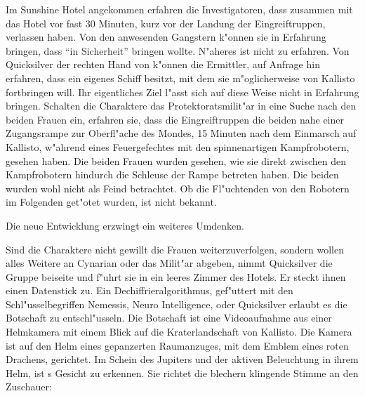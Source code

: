 Im Sunshine Hotel angekommen erfahren die Investigatoren, dass \xl{} zusammen mit \ml{} das Hotel vor fast 30 Minuten, kurz vor der Landung der Eingreiftruppen, verlassen haben. Von den anwesenden Gangstern k"onnen sie in Erfahrung bringen, dass \xl{} \ml{} ``in Sicherheit'' bringen wollte. N"aheres ist nicht zu erfahren. Von Quicksilver der rechten Hand von \xl{} k"onnen die Ermittler, auf Anfrage hin erfahren, dass \xl{} ein eigenes Schiff besitzt, mit dem sie m"oglicherweise \ml{} von Kallisto fortbringen will. Ihr eigentliches Ziel l"asst sich auf diese Weise nicht in Erfahrung bringen. Schalten die Charaktere das Protektoratsmilit"ar in eine Suche nach den beiden Frauen ein, erfahren sie, dass die Eingreiftruppen die beiden nahe einer Zugangsrampe zur Oberfl"ache des Mondes, 15 Minuten nach dem Einmarsch auf Kallisto, w"ahrend eines Feuergefechtes mit den spinnenartigen Kampfrobotern, gesehen haben. Die beiden Frauen wurden gesehen, wie sie direkt zwischen den Kampfrobotern hindurch die Schleuse der Rampe betreten haben. Die beiden wurden wohl nicht als Feind betrachtet. Ob die Fl"uchtenden von den Robotern im Folgenden get"otet wurden, ist nicht bekannt.

Die neue Entwicklung erzwingt ein weiteres Umdenken.

Sind die Charaktere nicht gewillt die Frauen weiterzuverfolgen, sondern wollen alles Weitere an Cynarian oder das Milit"ar abgeben, nimmt Quicksilver die Gruppe beiseite und f"uhrt sie in ein leeres Zimmer des Hotels. Er steckt ihnen einen Datenstick zu.  Ein Dechiffrieralgorithmus, gef"uttert mit den Schl"usselbegriffen Nemessis, Neuro Intelligence, \xl{} oder Quicksilver erlaubt es die Botschaft zu entschl"usseln. Die Botschaft ist eine Videoaufnahme aus einer Helmkamera mit einem Blick auf die Kraterlandschaft von Kallisto. Die Kamera ist auf den Helm eines gepanzerten Raumanzuges, mit dem Emblem eines roten Drachens, gerichtet. Im Schein des Jupiters und der aktiven Beleuchtung in ihrem Helm, ist \xl{}s Gesicht zu erkennen. Sie richtet die blechern klingende Stimme an den Zuschauer:


